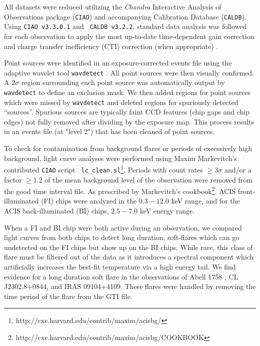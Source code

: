 \documentclass{emulateapj}
\begin{document}
All datasets were reduced utilizing the {\it Chandra} Interactive Analysis of
Observations package ({\tt CIAO}) and accompanying Calibration
Database ({\tt CALDB}). Using {\tt CIAO v3.3.0.1} and {\tt
CALDB v3.2.2}, standard data analysis was followed for each
observation to apply the most up-to-date time-dependent gain
correction and charge transfer inefficiency (CTI) correction (when
appropriate) \citep{2000ApJ...534L.139T}.

Point sources were identified in an exposure-corrected events file
using the adaptive wavelet tool {\tt wavdetect}
\citep{2002ApJS..138..185F}. All point sources were then visually
confirmed. A $2\sigma$ region surrounding each point source was
automatically output by {\tt wavdetect} to define an exclusion
mask. We then added regions for point sources which were missed by
{\tt wavdetect} and deleted regions for spuriously detected
``sources''. Spurious sources are typically faint CCD features (chip
gaps and chip edges) not fully removed after dividing by the exposure
map. This process results in an events file (at "level 2") that has
been cleaned of point sources.

To check for contamination from background flares or periods of
excessively high background, light curve analyses were performed using
Maxim Markevitch's contributed {\tt CIAO} script {\tt
lc\_clean.sl}\footnote{http://cxc.harvard.edu/contrib/maxim/acisbg/}.
Periods with count rates $\geq 3\sigma$ and/or a factor $\geq 1.2$ of
the mean background level of the observation were removed from the
good time interval file. As prescribed by Markevitch's
cookbook\footnote{http://cxc.harvard.edu/contrib/maxim/acisbg/COOKBOOK},
ACIS front-illuminated (FI) chips were analyzed in the $0.3-12.0$ keV
range, and for the ACIS back-illuminated (BI) chips, $2.5-7.0$ keV
energy range.

When a FI and BI chip were both active during an observation, we
compared light curves from both chips to detect long duration,
soft-flares which can go undetected on the FI chips but show up on the
BI chips. While rare, this class of flare must be filtered out of the
data as it introduces a spectral component which artificially
increases the best-fit temperature via a high energy tail. We find
evidence for a long duration soft flare in the observations of Abell
1758 \citep{2004ApJ...613..831D}, CL J2302.8+0844, and IRAS
09104+4109. These flares were handled by removing the time period of
the flare from the GTI file.
\end{document}
